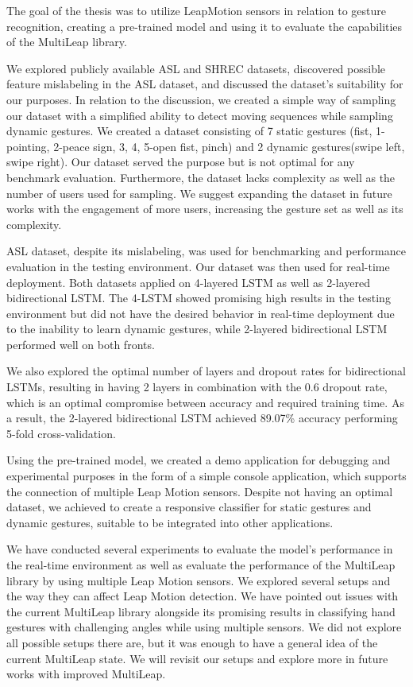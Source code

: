 The goal of the thesis was to utilize LeapMotion sensors in relation to gesture recognition, creating a pre-trained model and using it to evaluate the capabilities of the MultiLeap library.

We explored publicly available ASL and SHREC datasets, discovered possible feature mislabeling in the ASL dataset, and discussed the dataset's suitability for our purposes. In relation to the discussion, we created a simple way of sampling our dataset with a simplified ability to detect moving sequences while sampling dynamic gestures. We created a dataset consisting of 7 static gestures (fist, 1-pointing, 2-peace sign, 3, 4, 5-open fist, pinch) and 2 dynamic gestures(swipe left, swipe right). Our dataset served the purpose but is not optimal for any benchmark evaluation. Furthermore, the dataset lacks complexity as well as the number of users used for sampling. We suggest expanding the dataset in future works with the engagement of more users, increasing the gesture set as well as its complexity.

ASL dataset, despite its mislabeling, was used for benchmarking and performance evaluation in the testing environment. Our dataset was then used for real-time deployment. Both datasets applied on 4-layered LSTM as well as 2-layered bidirectional LSTM. The 4-LSTM showed promising high results in the testing environment but did not have the desired behavior in real-time deployment due to the inability to learn dynamic gestures, while 2-layered bidirectional LSTM performed well on both fronts. 

We also explored the optimal number of layers and dropout rates for bidirectional LSTMs, resulting in having 2 layers in combination with the 0.6 dropout rate, which is an optimal compromise between accuracy and required training time. As a result, the 2-layered bidirectional LSTM achieved 89.07\% accuracy performing 5-fold cross-validation.

Using the pre-trained model, we created a demo application for debugging and experimental purposes in the form of a simple console application, which supports the connection of multiple Leap Motion sensors. Despite not having an optimal dataset, we achieved to create a responsive classifier for static gestures and dynamic gestures, suitable to be integrated into other applications. 

We have conducted several experiments to evaluate the model's performance in the real-time environment as well as evaluate the performance of the MultiLeap library by using multiple Leap Motion sensors. We explored several setups and the way they can affect Leap Motion detection. We have pointed out issues with the current MultiLeap library alongside its promising results in classifying hand gestures with challenging angles while using multiple sensors. We did not explore all possible setups there are, but it was enough to have a general idea of the current MultiLeap state. We will revisit our setups and explore more in future works with improved MultiLeap.

